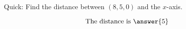 \documentclass{ximera}
\author{Bart Snapp}
\begin{document}
\begin{exercise}
  Quick: Find the distance between $(8,5,0)$ and the $x$-axis.
  \begin{prompt}
  \[
  \text{The distance is }\answer{5}
  \]
  \end{prompt}
\end{exercise}
\end{document}
